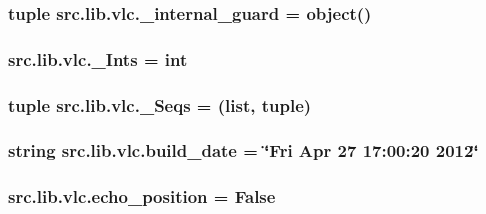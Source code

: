 \subsubsection[{\+\_\+internal\+\_\+guard}]{\setlength{\rightskip}{0pt plus 5cm}tuple src.\+lib.\+vlc.\+\_\+internal\+\_\+guard = object()}\label{namespacesrc_1_1lib_1_1vlc_aa20040a53d2ed3a0579dd029a9300320}
\hypertarget{namespacesrc_1_1lib_1_1vlc_a6c7026f38c337af620b7f4b543da739f}{}
\subsubsection[{\+\_\+\+Ints}]{\setlength{\rightskip}{0pt plus 5cm}src.\+lib.\+vlc.\+\_\+\+Ints = int}\label{namespacesrc_1_1lib_1_1vlc_a6c7026f38c337af620b7f4b543da739f}
\hypertarget{namespacesrc_1_1lib_1_1vlc_a87bd402c7a97b5eea5744a14f949ca96}{}
\subsubsection[{\+\_\+\+Seqs}]{\setlength{\rightskip}{0pt plus 5cm}tuple src.\+lib.\+vlc.\+\_\+\+Seqs = (list, tuple)}\label{namespacesrc_1_1lib_1_1vlc_a87bd402c7a97b5eea5744a14f949ca96}
\hypertarget{namespacesrc_1_1lib_1_1vlc_a2984141e3f9ed00c9434c99a3e7bb178}{}
\subsubsection[{build\+\_\+date}]{\setlength{\rightskip}{0pt plus 5cm}string src.\+lib.\+vlc.\+build\+\_\+date = \char`\"{}Fri Apr 27 17\+:00\+:20 2012\char`\"{}}\label{namespacesrc_1_1lib_1_1vlc_a2984141e3f9ed00c9434c99a3e7bb178}
\hypertarget{namespacesrc_1_1lib_1_1vlc_a88ac1021d884b74f9578ec7be48d7cad}{}
\subsubsection[{echo\+\_\+position}]{\setlength{\rightskip}{0pt plus 5cm}src.\+lib.\+vlc.\+echo\+\_\+position = False}\label{namespacesrc_1_1lib_1_1vlc_a88ac1021d884b74f9578ec7be48d7cad}
\hypertarget{namespacesrc_1_1lib_1_1vlc_ae922780d616514f232b958b05f06cbb6}{}
